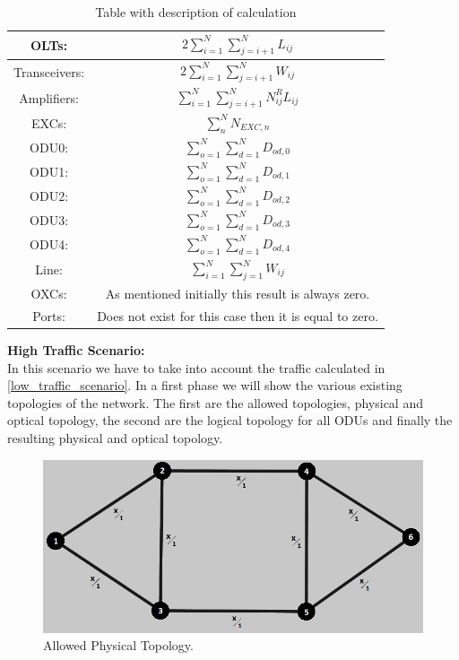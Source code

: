 \begin{table}[H]
\centering
\begin{tabular}{|| c | c ||}
 \hline
 OLTs: & \(\displaystyle 2 \sum_{i=1}^{N}\sum_{j=i+1}^{N} L_{ij} \) \\ \hline
 Transceivers: & \(\displaystyle 2 \sum_{i=1}^{N}\sum_{j=i+1}^{N} W_{ij} \) \\ \hline
 Amplifiers: & \(\displaystyle \sum_{i=1}^{N}\sum_{j=i+1}^{N} N^R_{ij} L_{ij} \) \\ \hline
 EXCs: & \(\displaystyle \sum_n^N N_{EXC,n} \) \\ \hline
 ODU0: & \(\displaystyle \sum_{o=1}^{N}\sum_{d=1}^{N} D_{od,0} \) \\ \hline
 ODU1: & \(\displaystyle \sum_{o=1}^{N}\sum_{d=1}^{N} D_{od,1} \) \\ \hline
 ODU2: & \(\displaystyle \sum_{o=1}^{N}\sum_{d=1}^{N} D_{od,2} \)\\ \hline
 ODU3: & \(\displaystyle \sum_{o=1}^{N}\sum_{d=1}^{N} D_{od,3} \) \\ \hline
 ODU4: & \(\displaystyle \sum_{o=1}^{N}\sum_{d=1}^{N} D_{od,4} \) \\ \hline
 Line: & \(\displaystyle \sum_{i=1}^{N}\sum_{j=1}^{N} W_{ij} \) \\ \hline
 OXCs: & As mentioned initially this result is always zero. \\ \hline
 Ports: & Does not exist for this case then it is equal to zero. \\
 \hline
 \end{tabular}
\caption{Table with description of calculation}
\label{formulas_opaque_surv_ref_medium_heuristic}
\end{table}

\textbf{High Traffic Scenario:}\\

In this scenario we have to take into account the traffic calculated in \ref{low_traffic_scenario}. In a first phase we will show the various existing topologies of the network. The first are the allowed topologies, physical and optical topology, the second are the logical topology for all ODUs and finally the resulting physical and optical topology.\\

\begin{figure}[H]
\centering
\includegraphics[width=13cm]{sdf/heuristic/figures/topologies/opaque_protec/high/allowed_physical_high}
\caption{Allowed Physical Topology.}
\label{allowed_physical_surv_ref_high_heuristic}
\end{figure}


